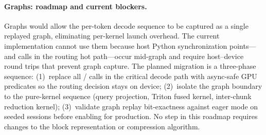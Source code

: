 \paragraph{\cuda{} Graphs: roadmap and current blockers.}
\label{par:cuda-graphs}
\cuda{} Graphs would allow the per-token decode sequence to be captured as a single replayed
graph, eliminating per-kernel launch overhead. The current implementation cannot use them
because host Python synchronization points--- and 
calls in the routing hot path---occur mid-graph and require host--device round trips that
prevent graph capture. The planned migration is a three-phase sequence: (1)~replace all
 /  calls in the critical decode path with async-safe GPU
predicates so the routing decision stays on device; (2)~isolate the graph boundary to the
pure-kernel sequence (query projection, Triton fused kernel, inter-chunk reduction kernel);
(3)~validate graph replay bit-exactness against eager mode on seeded sessions before enabling
for production. No step in this roadmap requires changes to the block representation or
compression algorithm.
